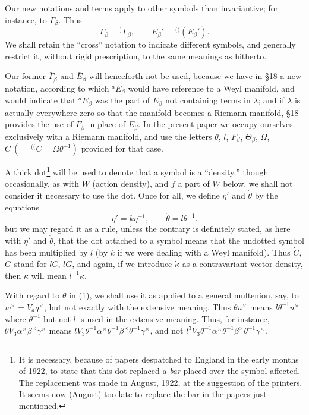 \documentclass[11pt]{article}
\newcommand{\markpair}[3]{{}^{#1#2}#3}
\begin{document}
\indent Our new notations and terms apply to other symbols than invariantive; for instance, to $\Gamma_\beta$. Thus
\[
  \Gamma_\beta={}^{)}\Gamma_\beta,\qquad E_\beta'=\markpair{(}{(}{(E_\beta')}.
\]
We shall retain the ``cross'' notation to indicate different symbols, and generally restrict it, without rigid prescription, to the same meanings as hitherto.

\indent Our former $\bar\Gamma_\beta$ and $\bar E_\beta$ will henceforth not be used, because we have in §18 a new notation, according to which ${}^aE_\beta$ would have reference to a Weyl manifold, and would indicate that ${}^aE_\beta$ was the part of $E_\beta$ not containing terms in $\lambda$; and if $\lambda$ is actually everywhere zero so that the manifold becomes a Riemann manifold, §18 provides the use of $F_\beta$ in place of $E_\beta$. In the present paper we occupy ourselves exclusively with a Riemann manifold, and use the letters $\theta$, $l$, $F_\beta$, $\Theta_\beta$, $\Omega$, $C\ (=\markpair{(}{(}{C}=\Omega\theta^{-1})$ provided for that case.

\indent A thick dot\footnote{It is necessary, because of papers despatched to England in the early months of 1922, to state that this dot replaced a \emph{bar} placed over the symbol affected. The replacement was made in August, 1922, at the suggestion of the printers. It seems now (August) too late to replace the bar in the papers just mentioned.} will be used to denote that a symbol is a ``density,'' though occasionally, as with $W$ (action density), and $f$ a part of $W$ below, we shall not consider it necessary to use the dot. Once for all, we define $\dot\eta'$ and $\dot\theta$ by the equations
\begin{equation}
  \dot\eta'=k\eta^{-1},\qquad \dot\theta=l\theta^{-1}.
\tag{1}
\end{equation}
but we may regard it as a rule, unless the contrary is definitely stated, as here with $\dot\eta'$ and $\dot\theta$, that the dot attached to a symbol means that the undotted symbol has been multiplied by $l$ (by $k$ if we were dealing with a Weyl manifold). Thus $\dot C$, $\dot G$ stand for $lC$, $lG$, and again, if we introduce $\dot\kappa$ as a contravariant vector density, then $\kappa$ will mean $l^{-1}\dot\kappa$.

\indent With regard to $\dot\theta$ in (1), we shall use it as applied to a general multenion, say, to $w^\times=V_aq^\times$, but not exactly with the extensive meaning. Thus $\dot\theta u^\times$ means $l\theta^{-1}u^\times$ where $\theta^{-1}$ but not $l$ is used in the extensive meaning. Thus, for instance, $\dot\theta V_3\alpha^\times\beta^\times\gamma^\times$ means {\small$lV_3\theta^{-1}\alpha^\times\theta^{-1}\beta^\times\theta^{-1}\gamma^\times$}, and not {\small$l^3V_3\theta^{-1}\alpha^\times\theta^{-1}\beta^\times\theta^{-1}\gamma^\times$}.
\end{document}
